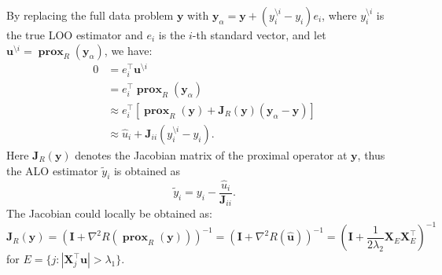 \documentclass[11pt]{article}
\newcommand{\bu}{\bm{u}}
\newcommand{\by}{\bm{y}}
\newcommand{\bI}{\bm{I}}
\newcommand{\bJ}{\bm{J}}
\newcommand{\bX}{\bm{X}}
\DeclareMathOperator{\bprox}{\mathbf{prox}}
\begin{document}
By replacing the full data problem $\by$ with $\by_{\alpha} = \by + (y_{i}^{\setminus i}-y_{i})e_{i}$, where $y_{i}^{\setminus i}$ is the true LOO estimator and $e_{i}$ is the $i$-th standard vector, and let $\bu^{\setminus i} = \bprox_{R}(\by_{\alpha})$, we have:
\begin{align*}
0 &= e_{i}^{\top}\bu^{\setminus i}\\
& = e_{i}^{\top}\bprox_{R}(\by_{\alpha})\\
& \approx e_{i}^{\top}[\bprox_{R}(\by)+\bJ_{R}(\by)(\by_{\alpha}-\by)]\\
& \approx \hat{u}_{i} + \bJ_{ii}(y_{i}^{\setminus i}-y_{i}).
\end{align*} Here $\bJ_{R}(\by)$ denotes the Jacobian matrix of the proximal operator at $\by$, thus the ALO estimator $\tilde{y}_{i}$ is obtained as 
	\begin{equation}
	\tilde{y}_{i} = y_{i} - \frac{\hat{u}_{i}}{\bJ_{ii}}.
	\end{equation}
The Jacobian could locally be obtained as:
	\begin{equation}
	\bJ_{R}(\by)= (\bI+\nabla^{2}R(\bprox_{R}(\by)))^{-1}= (\bI + \nabla^{2}R(\hat{\bu}))^{-1}= \left(\bI + \frac{1}{2\lambda_{2}}\bX_{E}\bX_{E}^{\top}\right)^{-1}
	\end{equation}
for $E = \{j:|\bX_{j}^{\top}\bu|>\lambda_{1}\}$.
\end{document}
